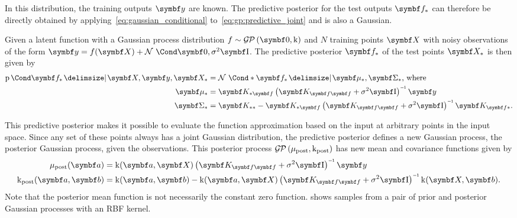 In this distribution, the training outputs $\mat{y}$ are known.
The predictive posterior for the test outputs $\mat{f}_\ast$ can therefore be directly obtained by applying~\cref{eq:gaussian_conditional} to~\cref{eq:gp:predictive_joint} and is also a Gaussian.
\begin{lemma}
    \label{lem:gp:gp_posterior}
    Given a latent function with a Gaussian process distribution $f \sim \GP(\mat{0}, \K)$ and $N$ training points $\mat{X}$ with noisy observations of the form $\mat{y} = f(\mat{X}) + \Gaussian{\mat{0}, \sigma^2 \Eye}$.
    The predictive posterior $\mat{f}_\ast$ of the test points $\mat{X}_\ast$ is then given by
    \begin{equation}
        \begin{split}
            \Prob{\mat{f}_\ast \given \mat{X}, \mat{y}, \mat{X}_\ast}
            &= \Gaussian*{\mat{f}_\ast \given \mat{\mu}_\ast, \mat{\Sigma}_\ast} \text{, where} \\
            \mat{\mu}_\ast
            &= \mat{K}_{\ast \mat{f}} \left( \mat{K}_{\mat{f}\mat{f}} + \sigma^2 \Eye \right)\inv \mat{y} \\
            \mat{\Sigma}_\ast
            &= \mat{K}_{\ast\ast} - \mat{K}_{\ast \mat{f}} \left( \mat{K}_{\mat{f}\mat{f}} + \sigma^2 \Eye \right)\inv \mat{K}_{\mat{f}\ast}.
        \end{split}
    \end{equation}
\end{lemma}

This predictive posterior makes it possible to evaluate the function approximation based on the input at arbitrary points in the input space.
Since any set of these points always has a joint Gaussian distribution, the predictive posterior defines a new Gaussian process, the posterior Gaussian process, given the observations.
This posterior process $\operatorname{\mathcal{G\mkern-1mu P}\mkern3mu}(\mu_\text{post}, \operatorname{k}_\text{post})$ has new mean and covariance functions given by
\begin{equation}
    \begin{split}
        \mu_\text{post}(\mat{a}) &= \K(\mat{a}, \mat{X}) \left(\mat{K}_{\mat{f}\mat{f}} + \sigma^2 \Eye \right)\inv \mat{y} \\
        \K_\text{post}(\mat{a}, \mat{b}) &= \K(\mat{a}, \mat{b}) - \K(\mat{a}, \mat{X}) \left( \mat{K}_{\mat{f}\mat{f}} + \sigma^2 \Eye \right)\inv \K(\mat{X}, \mat{b}).
    \end{split}
\end{equation}
Note that the posterior mean function is not necessarily the constant zero function.
 shows samples from a pair of prior and posterior Gaussian processes with an RBF kernel.

